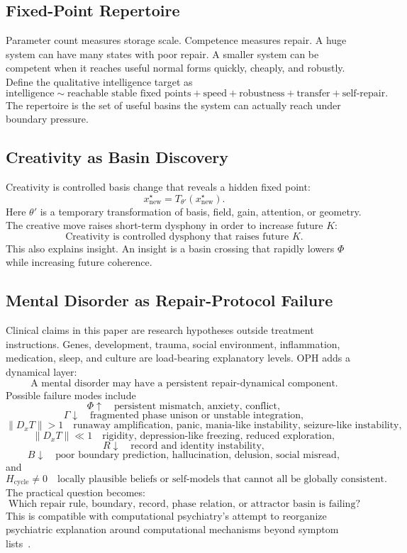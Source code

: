 \documentclass[11pt]{article}
\theoremstyle{remark}
\theoremstyle{plain}
\begin{document}
\subsection{Fixed-Point Repertoire}

Parameter count measures storage scale. Competence measures repair. A huge system can have many states with poor repair. A smaller system can be competent when it reaches useful normal forms quickly, cheaply, and robustly. Define the qualitative intelligence target as
\[
\boxed{
\text{intelligence}
\sim
\text{reachable stable fixed points}
+
\text{speed}
+
\text{robustness}
+
\text{transfer}
+
\text{self-repair}.
}
\]
The repertoire is the set of useful basins the system can actually reach under boundary pressure.

\subsection{Creativity as Basin Discovery}

Creativity is controlled basis change that reveals a hidden fixed point:
\[
x^\star_{\mathrm{new}}
=
T_{\theta'}(x^\star_{\mathrm{new}}).
\]
Here \(\theta'\) is a temporary transformation of basis, field, gain, attention, or geometry. The creative move raises short-term dysphony in order to increase future \(K\):
\[
\boxed{
\text{Creativity is controlled dysphony that raises future }K.
}
\]
This also explains insight. An insight is a basin crossing that rapidly lowers \(\Phi\) while increasing future coherence.

\subsection{Mental Disorder as Repair-Protocol Failure}

Clinical claims in this paper are research hypotheses outside treatment instructions. Genes, development, trauma, social environment, inflammation, medication, sleep, and culture are load-bearing explanatory levels. OPH adds a dynamical layer:
\[
\boxed{
\text{A mental disorder may have a persistent repair-dynamical component.}
}
\]
Possible failure modes include
\[
\Phi\uparrow
\quad\text{persistent mismatch, anxiety, conflict},
\]
\[
\Gamma\downarrow
\quad\text{fragmented phase unison or unstable integration},
\]
\[
\|D_xT\|>1
\quad\text{runaway amplification, panic, mania-like instability, seizure-like instability},
\]
\[
\|D_xT\|\ll1
\quad\text{rigidity, depression-like freezing, reduced exploration},
\]
\[
R\downarrow
\quad\text{record and identity instability},
\]
\[
B\downarrow
\quad\text{poor boundary prediction, hallucination, delusion, social misread},
\]
and
\[
H_{\mathrm{cycle}}\ne0
\quad\text{locally plausible beliefs or self-models that cannot all be globally consistent}.
\]
The practical question becomes:
\[
\boxed{
\text{Which repair rule, boundary, record, phase relation, or attractor basin is failing?}
}
\]
This is compatible with computational psychiatry's attempt to reorganize psychiatric explanation around computational mechanisms beyond symptom lists~\cite{ComputationalPsychiatryDisorder2024,Friston2023}.
\end{document}
